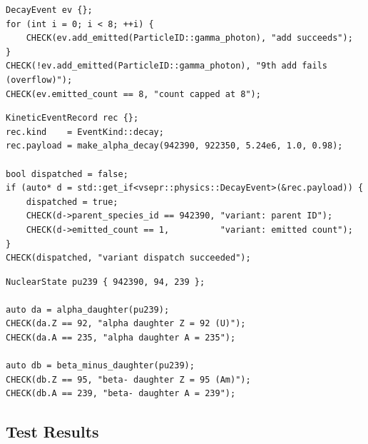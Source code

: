 \documentclass[11pt,a4paper]{article}
\begin{document}
\begin{lstlisting}[style=cpp20, caption={Overflow guard --- capacity capped at 8}]
DecayEvent ev {};
for (int i = 0; i < 8; ++i) {
    CHECK(ev.add_emitted(ParticleID::gamma_photon), "add succeeds");
}
CHECK(!ev.add_emitted(ParticleID::gamma_photon), "9th add fails (overflow)");
CHECK(ev.emitted_count == 8, "count capped at 8");
\end{lstlisting}

\begin{lstlisting}[style=cpp20, caption={Variant dispatch test}]
KineticEventRecord rec {};
rec.kind    = EventKind::decay;
rec.payload = make_alpha_decay(942390, 922350, 5.24e6, 1.0, 0.98);

bool dispatched = false;
if (auto* d = std::get_if<vsepr::physics::DecayEvent>(&rec.payload)) {
    dispatched = true;
    CHECK(d->parent_species_id == 942390, "variant: parent ID");
    CHECK(d->emitted_count == 1,          "variant: emitted count");
}
CHECK(dispatched, "variant dispatch succeeded");
\end{lstlisting}

\begin{lstlisting}[style=cpp20, caption={Daughter-state arithmetic test}]
NuclearState pu239 { 942390, 94, 239 };

auto da = alpha_daughter(pu239);
CHECK(da.Z == 92, "alpha daughter Z = 92 (U)");
CHECK(da.A == 235, "alpha daughter A = 235");

auto db = beta_minus_daughter(pu239);
CHECK(db.Z == 95, "beta- daughter Z = 95 (Am)");
CHECK(db.A == 239, "beta- daughter A = 239");
\end{lstlisting}

\subsection{Test Results}
\end{document}
